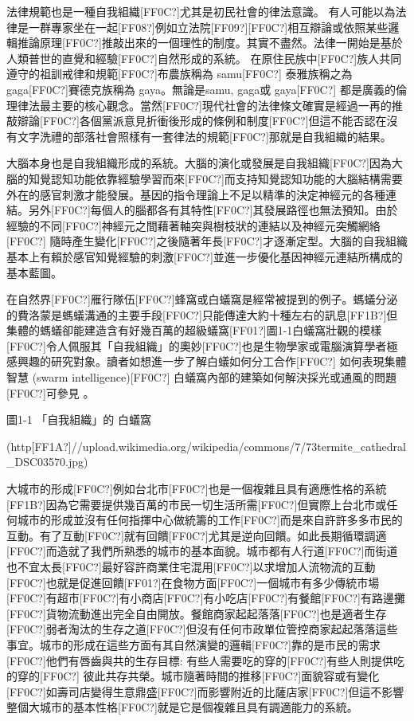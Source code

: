 法律規範也是一種自我組織[FF0C?]尤其是初民社會的律法意識。 有人可能以為法律是一群專家坐在一起[FF08?]例如立法院[FF09?][FF0C?]相互辯論或依照某些邏輯推論原理[FF0C?]推敲出來的一個理性的制度。其實不盡然。法律一開始是基於人類普世的直覺和經驗[FF0C?]自然形成的系統。 在原住民族中[FF0C?]族人共同遵守的祖訓戒律和規範[FF0C?]布農族稱為 samu[FF0C?] 泰雅族稱之為gaga[FF0C?]賽德克族稱為 gaya。無論是samu, gaga或 gaya[FF0C?] 都是廣義的倫理律法最主要的核心觀念。當然[FF0C?]現代社會的法律條文確實是經過一再的推敲辯論[FF0C?]各個黨派意見折衝後形成的條例和制度[FF0C?]但這不能否認在沒有文字洗禮的部落社會照樣有一套律法的規範[FF0C?]那就是自我組織的結果。  

大腦本身也是自我組織形成的系統。大腦的演化或發展是自我組織[FF0C?]因為大腦的知覺認知功能依靠經驗學習而來[FF0C?]而支持知覺認知功能的大腦結構需要外在的感官刺激才能發展。基因的指令理論上不足以精準的決定神經元的各種連結。另外[FF0C?]每個人的腦都各有其特性[FF0C?]其發展路徑也無法預知。由於經驗的不同[FF0C?]神經元之間藉著軸突與樹枝狀的連結以及神經元突觸網絡[FF0C?] 隨時產生變化[FF0C?]之後隨著年長[FF0C?]才逐漸定型。大腦的自我組織基本上有賴於感官知覺經驗的刺激[FF0C?]並進一步優化基因神經元連結所構成的基本藍圖。

在自然界[FF0C?]雁行隊伍[FF0C?]蜂窩或白蟻窩是經常被提到的例子。螞蟻分泌的費洛蒙是螞蟻溝通的主要手段[FF0C?]只能傳達大約十種左右的訊息[FF1B?]但集體的螞蟻卻能建造含有好幾百萬的超級蟻窩[FF01?]圖1-1白蟻窩壯觀的模樣[FF0C?]令人佩服其「自我組織」的奧妙[FF0C?]也是生物學家或電腦演算學者極感興趣的研究對象。讀者如想進一步了解白蟻如何分工合作[FF0C?] 如何表現集體智慧 (swarm intelligence)[FF0C?] 白蟻窩內部的建築如何解決採光或通風的問題[FF0C?]可參見 \citet{Margonelli2012}。




圖1-1 「自我組織」的 白蟻窩

(http[FF1A?]//upload.wikimedia.org/wikipedia/commons/7/73termite\_cathedral\_DSC03570.jpg)

大城市的形成[FF0C?]例如台北市[FF0C?]也是一個複雜且具有適應性格的系統[FF1B?]因為它需要提供幾百萬的市民一切生活所需[FF0C?]但實際上台北市或任何城市的形成並沒有任何指揮中心做統籌的工作[FF0C?]而是來自許許多多市民的互動。有了互動[FF0C?]就有回饋[FF0C?]尤其是逆向回饋。如此長期循環調適[FF0C?]而造就了我們所熟悉的城市的基本面貌。城市都有人行道[FF0C?]而街道也不宜太長[FF0C?]最好容許商業住宅混用[FF0C?]以求增加人流物流的互動[FF0C?]也就是促進回饋[FF01?]在食物方面[FF0C?]一個城市有多少傳統市場[FF0C?]有超市[FF0C?]有小商店[FF0C?]有小吃店[FF0C?]有餐館[FF0C?]有路邊攤[FF0C?]貨物流動進出完全自由開放。餐館商家起起落落[FF0C?]也是適者生存[FF0C?]弱者淘汰的生存之道[FF0C?]但沒有任何市政單位管控商家起起落落這些事宜。城市的形成在這些方面有其自然演變的邏輯[FF0C?]靠的是市民的需求[FF0C?]他們有唇齒與共的生存目標: 有些人需要吃的穿的[FF0C?]有些人則提供吃的穿的[FF0C?] 彼此共存共榮。城市隨著時間的推移[FF0C?]面貌容或有變化[FF0C?]如壽司店變得生意鼎盛[FF0C?]而影響附近的比薩店家[FF0C?]但這不影響整個大城市的基本性格[FF0C?]就是它是個複雜且具有調適能力的系統。

